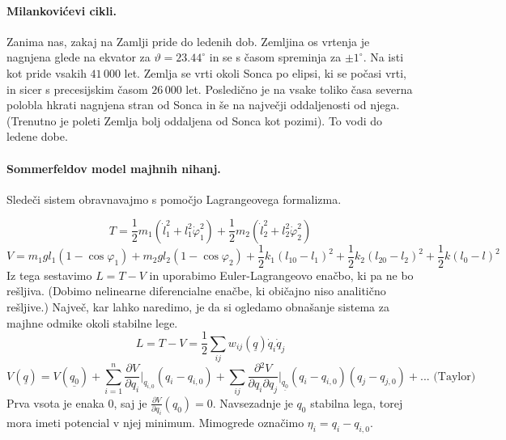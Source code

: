 \documentclass[a4paper]{article}
\newcommand{\pd}[2]{\frac{\partial {#1}}{\partial {#2}}}
\begin{document}
\paragraph{Milankovićevi cikli.} Zanima nas, zakaj na Zamlji pride do ledenih dob. Zemljina os vrtenja je nagnjena glede na ekvator za $\vartheta = 23.44^\circ$ in se s časom spreminja za $\pm 1^\circ$. Na isti kot pride vsakih $41\,000$ let.
Zemlja se vrti okoli Sonca po elipsi, ki se počasi vrti, in sicer s precesijskim časom $26\,000$ let. Posledično je na vsake toliko časa severna polobla hkrati nagnjena stran od Sonca in še na največji oddaljenosti od njega.
(Trenutno je poleti Zemlja bolj oddaljena od Sonca kot pozimi). To vodi do ledene dobe.
\paragraph{Sommerfeldov model majhnih nihanj.} Sledeči sistem obravnavajmo s pomočjo Lagrangeovega formalizma.
\begin{figure}[h!]
    \centering
\end{figure}
$$T = \frac{1}{2}m_1\left(\dot l_1^2 + l_1^2\dot\varphi_1^2\right) + \frac{1}{2}m_2\left(\dot l_2^2 + l_2^2\dot\varphi_2^2\right)$$
$$V = m_1gl_1(1 - \cos\varphi_1) + m_2gl_2(1 - \cos\varphi_2) + \frac{1}{2}k_1(l_{10} - l_1)^2 + \frac{1}{2}k_2(l_{20} - l_2)^2 + \frac{1}{2}k(l_0 - l)^2$$
Iz tega sestavimo $L = T - V$ in uporabimo Euler-Lagrangeovo enačbo, ki pa ne bo rešljiva. (Dobimo nelinearne diferencialne enačbe, ki običajno niso analitično rešljive.)
Največ, kar lahko naredimo, je da si ogledamo obnašanje sistema za majhne odmike okoli stabilne lege.
$$L = T - V = \frac{1}{2}\sum_{ij} w_{ij}(\underline{q})\dot q_i \dot q_j$$
$$V(\underline{q}) = V(\underline{q_0}) + \sum_{i=1}^{n} \pd{V}{q_i}\Big|_{q_{i,0}}(q_i - q_{i, 0}) + \sum_{ij} \pd{^2V}{q_i \partial q_j}\Big|_{\underline{q_{0}}}(q_i - q_{i, 0})(q_j - q_{j, 0}) + ... \text{ (Taylor)}$$
Prva vsota je enaka 0, saj je $\displaystyle{\pd{V}{q_i}(q_0) = 0}$. Navsezadnje je $q_0$ stabilna lega, torej mora imeti potencial v njej minimum. Mimogrede označimo $\eta_i = q_i - q_{i, 0}$.
\end{document}
